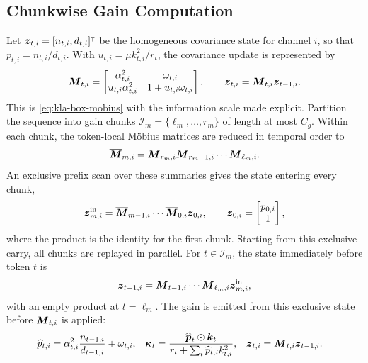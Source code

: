 \documentclass[11pt,letterpaper,logo]{yalearxiv}
\begin{document}
\subsection{Chunkwise Gain Computation}
\label{sec:chunkwise-gain}

Let $\boldsymbol{z}_{t,i}=[n_{t,i},d_{t,i}]^{\intercal}$ be the homogeneous covariance state for channel $i$,
so that $p_{t,i}=n_{t,i}/d_{t,i}$. With $u_{t,i}=\mu k_{t,i}^2/r_t$, the covariance update is
represented by
\begin{equation}
  \boldsymbol{M}_{t,i}
  =\begin{bmatrix}
    \alpha_{t,i}^2 & \omega_{t,i} \\
    u_{t,i}\alpha_{t,i}^2 & 1+u_{t,i}\omega_{t,i}
  \end{bmatrix},
  \qquad
  \boldsymbol{z}_{t,i}=\boldsymbol{M}_{t,i}\boldsymbol{z}_{t-1,i}.
  \label{eq:chunk-gain-covariance-mobius}
\end{equation}
This is \eqref{eq:kla-box-mobius} with the information scale made explicit. Partition the sequence
into gain chunks $\mathcal{I}_m=\{\ell_m,\ldots,r_m\}$ of length at most $C_g$. Within each chunk,
the token-local M\"obius matrices are reduced in temporal order to
\begin{equation}
  \overline{\boldsymbol{M}}_{m,i}
  =\boldsymbol{M}_{r_m,i}\boldsymbol{M}_{r_m-1,i}\cdots\boldsymbol{M}_{\ell_m,i}.
  \label{eq:chunk-gain-summary}
\end{equation}
An exclusive prefix scan over these summaries gives the state entering every chunk,
\begin{equation}
  \boldsymbol{z}^{\mathrm{in}}_{m,i}
  =\overline{\boldsymbol{M}}_{m-1,i}\cdots\overline{\boldsymbol{M}}_{0,i}\boldsymbol{z}_{0,i},
  \qquad
  \boldsymbol{z}_{0,i}=\begin{bmatrix}p_{0,i}\\1\end{bmatrix},
  \label{eq:chunk-gain-carry}
\end{equation}
where the product is the identity for the first chunk. Starting from this exclusive carry, all
chunks are replayed in parallel. For $t\in\mathcal{I}_m$, the state immediately before token $t$
is
\begin{equation}
  \boldsymbol{z}_{t-1,i}
  =\boldsymbol{M}_{t-1,i}\cdots\boldsymbol{M}_{\ell_m,i}\boldsymbol{z}^{\mathrm{in}}_{m,i},
  \label{eq:chunk-gain-local-prefix}
\end{equation}
with an empty product at $t=\ell_m$. The gain is emitted from this exclusive state before
$\boldsymbol{M}_{t,i}$ is applied:
\begin{equation}
\begin{aligned}
  \widehat p_{t,i}
  &=\alpha_{t,i}^2\frac{n_{t-1,i}}{d_{t-1,i}}+\omega_{t,i},
  &
  \boldsymbol{\kappa}_t
  &=\frac{\widehat{\boldsymbol{p}}_t\odot\boldsymbol{k}_t}
  {r_t+\sum_i\widehat p_{t,i}k_{t,i}^2},
  &
  \boldsymbol{z}_{t,i}&=\boldsymbol{M}_{t,i}\boldsymbol{z}_{t-1,i}.
\end{aligned}
  \label{eq:chunk-gain-emission}
\end{equation}
\end{document}

